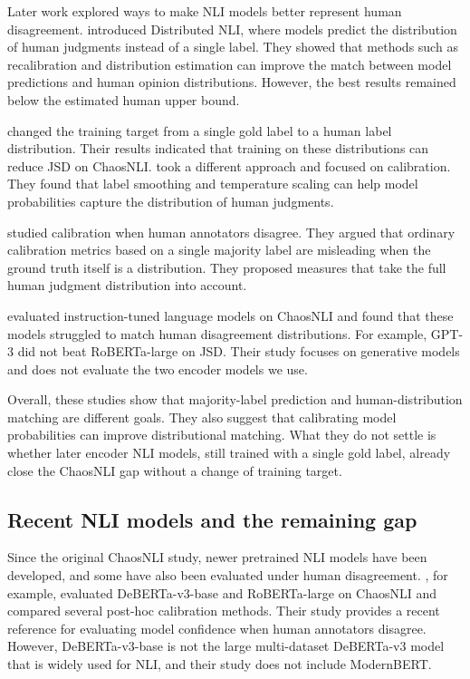 \documentclass[11pt,a4paper]{article}
\begin{document}
Later work explored ways to make NLI models better represent human disagreement. \citet{zhou2022distributed} introduced Distributed NLI, where models predict the distribution of human judgments instead of a single label. They showed that methods such as recalibration and distribution estimation can improve the match between model predictions and human opinion distributions. However, the best results remained below the estimated human upper bound.

\citet{meissner2021capturing} changed the training target from a single gold label to a human label distribution. Their results indicated that training on these distributions can reduce JSD on ChaosNLI. \citet{wang2022calibrated} took a different approach and focused on calibration. They found that label smoothing and temperature scaling can help model probabilities capture the distribution of human judgments.

\citet{baan2022stop} studied calibration when human annotators disagree. They argued that ordinary calibration metrics based on a single majority label are misleading when the ground truth itself is a distribution. They proposed measures that take the full human judgment distribution into account.

\citet{lee2023dissenting} evaluated instruction-tuned language models on ChaosNLI and found that these models struggled to match human disagreement distributions. For example, GPT-3 did not beat RoBERTa-large on JSD. Their study focuses on generative models and does not evaluate the two encoder models we use.

Overall, these studies show that majority-label prediction and human-distribution matching are different goals. They also suggest that calibrating model probabilities can improve distributional matching. What they do not settle is whether later encoder NLI models, still trained with a single gold label, already close the ChaosNLI gap without a change of training target.

\subsection{Recent NLI models and the remaining gap}

Since the original ChaosNLI study, newer pretrained NLI models have been developed, and some have also been evaluated under human disagreement. \citet{tao2026confidence}, for example, evaluated DeBERTa-v3-base and RoBERTa-large on ChaosNLI and compared several post-hoc calibration methods. Their study provides a recent reference for evaluating model confidence when human annotators disagree. However, DeBERTa-v3-base is not the large multi-dataset DeBERTa-v3 model that is widely used for NLI, and their study does not include ModernBERT.
\end{document}
